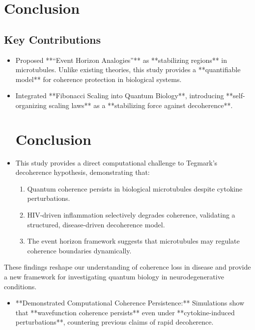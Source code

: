 \section{Conclusion}
\subsection{Key Contributions}
\begin{itemize}
\item Proposed **“Event Horizon Analogies”** as **stabilizing regions** in microtubules. Unlike existing theories, this study provides a **quantifiable model** for coherence protection in biological systems.
 \item Integrated **Fibonacci Scaling into Quantum Biology**, introducing **self-organizing scaling laws** as a **stabilizing force against decoherence**.
\section{Conclusion}
\item This study provides a direct computational challenge to Tegmark’s decoherence hypothesis, demonstrating that:
\begin{enumerate}
\item Quantum coherence persists in biological microtubules despite cytokine perturbations.
    \item HIV-driven inflammation selectively degrades coherence, validating a structured, disease-driven decoherence model.
    \item The event horizon framework suggests that microtubules may regulate coherence boundaries dynamically.
\end{enumerate}
\end{itemize}
These findings reshape our understanding of coherence loss in disease and provide a new framework for investigating quantum biology in neurodegenerative conditions.
\begin{itemize}
        \item **Demonstrated Computational Coherence Persistence:** Simulations show that **wavefunction coherence persists** even under **cytokine-induced perturbations**, countering previous claims of rapid decoherence.
\end{itemize}
